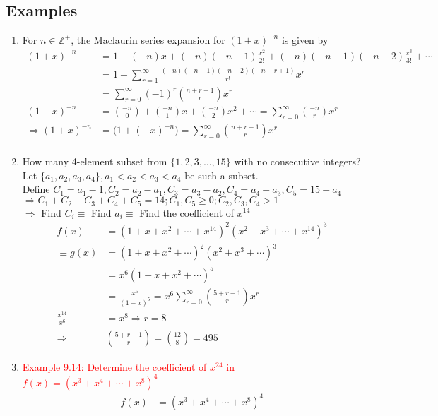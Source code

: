 \documentclass[a4paper]{article}
\begin{document}
\subsection*{Examples}
\begin{enumerate}
    \item For $n\in\mathbb{Z}^+$, the Maclaurin series expansion for $(1+x)^{-n}$ is given by
    \begin{align*}
        (1+x)^{-n}&=1+(-n)x+(-n)(-n-1)\frac{x^2}{2!}+(-n)(-n-1)(-n-2)\frac{x^3}{3!}+\cdots\\
        &=1+\sum_{r=1}^{\infty}{\frac{(-n)(-n-1)(-n-2)(-n-r+1)}{r!}x^r}\\
        &=\sum_{r=0}^{\infty}{(-1)^r\binom{n+r-1}{r} x^r}\\
        (1-x)^{-n}&=\binom{-n}{0}+\binom{-n}{1}x+\binom{-n}{2}x^2+\cdots=\sum_{r=0}^{\infty}{\binom{-n}{r}x^r}\\
        \Rightarrow (1+x)^{-n}&=\bigl(1+(-x)^{-n}\bigr)=\sum_{r=0}^{\infty}{\binom{n+r-1}{r} x^r}\\
    \end{align*}
    \item How many 4-element subset from $\{1,2,3,\ldots,15\}$ with no consecutive integers?\\
    Let $\{a_1,a_2,a_3,a_4\}, a_1<a_2<a_3<a_4$ be such a subset.\\
    Define $C_1=a_1-1,C_2=a_2-a_1,C_3=a_3-a_2,C_4=a_4-a_3,C_5=15-a_4$\\
    $\Rightarrow C_1+C_2+C_3+C_4+C_5=14;C_1,C_5\geq 0; C_2,C_3,C_4>1$\\
    $\Rightarrow$ Find $C_i \equiv$ Find $a_i \equiv$ Find the coefficient of $x^{14}$
    \begin{align*}
    f(x)&=(1+x+x^2+\cdots+x^{14})^2(x^2+x^3+\cdots+x^{14})^3\\
    \equiv g(x)&=(1+x+x^2+\cdots)^2(x^2+x^3+\cdots)^3\\
    &=x^6(1+x+x^2+\cdots)^5\\
    &=\frac{x^6}{(1-x)^5}=x^6\sum_{r=0}^{\infty}{\binom{5+r-1}{r}x^r}\\
    \frac{x^{14}}{x^6}&=x^8\Rightarrow r=8\\
    \Rightarrow&\binom{5+r-1}{r}=\binom{12}{8}=495
    \end{align*}
    \item \textcolor{red}{Example 9.14: Determine the coefficient of $x^{24}$ in $f(x)=(x^3+x^4+\cdots+x^8)^4$}
    \begin{align*}
        f(x)&=(x^3+x^4+\cdots+x^8)^4\\

\end{align*}
\end{enumerate}
\end{document}
